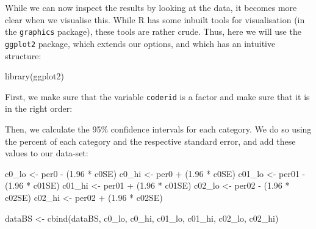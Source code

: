 \documentclass[
]{article}
\newenvironment{Shaded}{\begin{snugshade}}{\end{snugshade}}
\newcommand{\DecValTok}[1]{\textcolor[rgb]{0.00,0.00,0.81}{#1}}
\newcommand{\FloatTok}[1]{\textcolor[rgb]{0.00,0.00,0.81}{#1}}
\newcommand{\FunctionTok}[1]{\textcolor[rgb]{0.00,0.00,0.00}{#1}}
\newcommand{\NormalTok}[1]{#1}
\newcommand{\OtherTok}[1]{\textcolor[rgb]{0.56,0.35,0.01}{#1}}
\newcommand{\SpecialCharTok}[1]{\textcolor[rgb]{0.00,0.00,0.00}{#1}}
\begin{document}
While we can now inspect the results by looking at the data, it becomes more clear when we visualise this. While R has some inbuilt tools for visualisation (in the \texttt{graphics} package), these tools are rather crude. Thus, here we will use the \texttt{ggplot2} package, which extends our options, and which has an intuitive structure:

\begin{Shaded}
\begin{Highlighting}[]
\FunctionTok{library}\NormalTok{(ggplot2)}
\end{Highlighting}
\end{Shaded}

First, we make sure that the variable \texttt{coderid} is a factor and make sure that it is in the right order:

\begin{Shaded}
\end{Shaded}

Then, we calculate the 95\% confidence intervals for each category. We do so using the percent of each category and the respective standard error, and add these values to our data-set:

\begin{Shaded}
\begin{Highlighting}[]
\NormalTok{c0\_lo }\OtherTok{\textless{}{-}}\NormalTok{ per0 }\SpecialCharTok{{-}}\NormalTok{ (}\FloatTok{1.96} \SpecialCharTok{*}\NormalTok{ c0SE)}
\NormalTok{c0\_hi }\OtherTok{\textless{}{-}}\NormalTok{ per0 }\SpecialCharTok{+}\NormalTok{ (}\FloatTok{1.96} \SpecialCharTok{*}\NormalTok{ c0SE)}
\NormalTok{c01\_lo }\OtherTok{\textless{}{-}}\NormalTok{ per01 }\SpecialCharTok{{-}}\NormalTok{ (}\FloatTok{1.96} \SpecialCharTok{*}\NormalTok{ c01SE)}
\NormalTok{c01\_hi }\OtherTok{\textless{}{-}}\NormalTok{ per01 }\SpecialCharTok{+}\NormalTok{ (}\FloatTok{1.96} \SpecialCharTok{*}\NormalTok{ c01SE)}
\NormalTok{c02\_lo }\OtherTok{\textless{}{-}}\NormalTok{ per02 }\SpecialCharTok{{-}}\NormalTok{ (}\FloatTok{1.96} \SpecialCharTok{*}\NormalTok{ c02SE)}
\NormalTok{c02\_hi }\OtherTok{\textless{}{-}}\NormalTok{ per02 }\SpecialCharTok{+}\NormalTok{ (}\FloatTok{1.96} \SpecialCharTok{*}\NormalTok{ c02SE)}

\NormalTok{dataBS }\OtherTok{\textless{}{-}} \FunctionTok{cbind}\NormalTok{(dataBS, c0\_lo, c0\_hi, c01\_lo, c01\_hi, c02\_lo,}
\NormalTok{    c02\_hi)}
\end{Highlighting}
\end{Shaded}
\end{document}
